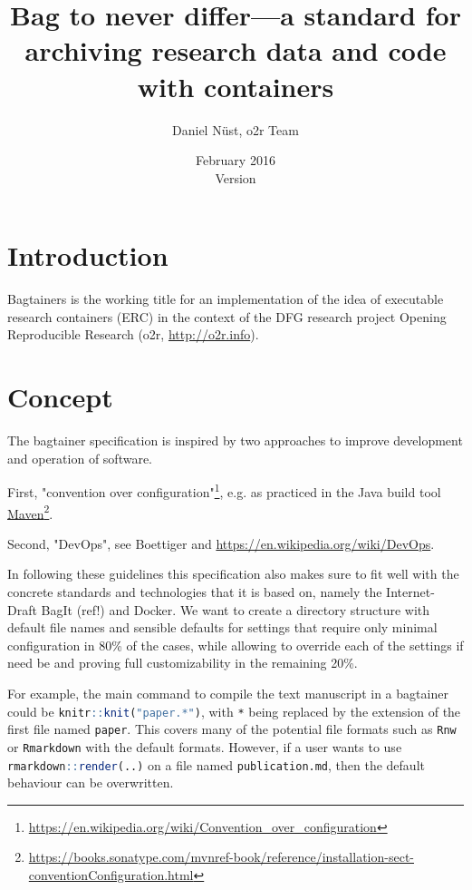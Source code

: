 \documentclass[twoside,a4paper,draft]{refart}
\title{Bag to never differ---a standard for archiving research data and code with containers}
\author{Daniel Nüst, o2r Team}
\date{February 2016\\ \vspace{1em}Version \specversion}
\def\inliner{\lstinline[basicstyle=\ttfamily,language=R,keywordstyle={}]} % http://tex.stackexchange.com/questions/44702/can-you-change-lstinline-without-changing-the-global-lstset
\begin{document}
\maketitle


\section{Introduction}

Bagtainers is the working title for an implementation of the idea of executable research containers (ERC) in the context of the DFG research project Opening Reproducible Research (o2r, \url{http://o2r.info}).


\section{Concept}

The bagtainer specification is inspired by two approaches to improve development and operation of software.

First, "convention over configuration"\footnote{\url{https://en.wikipedia.org/wiki/Convention_over_configuration}}, e.g. as practiced in the Java build tool \href{https://maven.apache.org/what-is-maven.html}{Maven}\footnote{\url{https://books.sonatype.com/mvnref-book/reference/installation-sect-conventionConfiguration.html}}.

Second, "DevOps", see Boettiger and \url{https://en.wikipedia.org/wiki/DevOps}.

In following these guidelines this specification also makes sure to fit well with the concrete standards and technologies that it is based on, namely the Internet-Draft BagIt (ref!) and Docker. We want to create a directory structure with default file names and sensible defaults for settings that require only minimal configuration in 80\% of the cases, while allowing to override each of the settings if need be and proving full customizability in the remaining 20\%.

For example, the main command to compile the text manuscript in a bagtainer could be \inliner{knitr::knit("paper.*")}, with \texttt{*} being replaced by the extension of the first file named \texttt{paper}. This covers many of the potential file formats such as \texttt{Rnw} or \texttt{Rmarkdown} with the default formats. However, if a user wants to use \inliner{rmarkdown::render(..)} on a file named \texttt{publication.md}, then the default behaviour can be overwritten.
\end{document}
